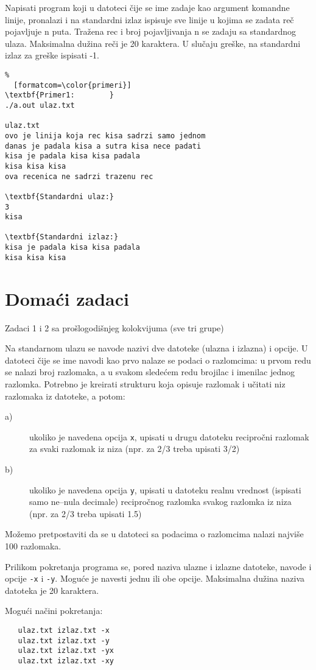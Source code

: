 \documentclass{article}
\begin{document}
\begin{z} 
Napisati program koji u datoteci čije se ime zadaje kao argument komandne linije, pronalazi i na standardni izlaz ispisuje sve linije u kojima se zadata reč pojavljuje n puta. Tražena rec i broj pojavljivanja n se zadaju sa standardnog ulaza. Maksimalna dužina reči je 20 karaktera. U slučaju greške, na standardni izlaz za greške ispisati -1.
\begin{Verbatim}%
  [formatcom=\color{primeri}]
\textbf{Primer1:        }
./a.out ulaz.txt

ulaz.txt
ovo je linija koja rec kisa sadrzi samo jednom
danas je padala kisa a sutra kisa nece padati
kisa je padala kisa kisa padala
kisa kisa kisa
ova recenica ne sadrzi trazenu rec

\textbf{Standardni ulaz:}
3
kisa

\textbf{Standardni izlaz:}
kisa je padala kisa kisa padala
kisa kisa kisa

\end{Verbatim}  
\end{z}

\newpage

\section{Domaći zadaci}

\begin{z}
Zadaci 1 i 2 sa prošlogodišnjeg kolokvijuma (sve tri grupe)
\end{z}

\begin{z}
Na standarnom ulazu se navode nazivi dve datoteke (ulazna i izlazna) i opcije. 
U datoteci \v cije se ime navodi kao prvo nalaze se podaci o razlomcima: 
   u prvom redu se nalazi broj razlomaka, a u svakom slede\' cem redu brojilac i imenilac jednog razlomka. 
   Potrebno je kreirati strukturu koja opisuje razlomak i u\v citati niz razlomaka
   iz datoteke, a potom:
   \begin{description}
      \item[a)] ukoliko je navedena opcija {\tt x}, upisati u drugu datoteku  
         recipro\v cni razlomak za svaki razlomak iz niza (npr. za 2/3 treba upisati 3/2)
      \item[b)] ukoliko je navedena opcija {\tt y}, upisati u datoteku 
         realnu vrednost (ispisati samo ne--nula decimale) recipro\v cnog razlomka svakog razlomka iz niza 
(npr. za 2/3 treba upisati 1.5)  
   \end{description}
   Mo\v zemo pretpostaviti da se u datoteci sa podacima o razlomcima nalazi najvi\v se 100 razlomaka.

  Prilikom pokretanja programa se, pored naziva ulazne i izlazne
  datoteke, navode i opcije {\tt -x} i {\tt -y}. Mogu\'ce je navesti jednu ili
  obe opcije. Maksimalna du\v zina naziva datoteka je 20 karaktera.
  
  Mogu\' ci na\v cini pokretanja:
  \begin{Verbatim}
   ulaz.txt izlaz.txt -x
   ulaz.txt izlaz.txt -y
   ulaz.txt izlaz.txt -yx
   ulaz.txt izlaz.txt -xy
  \end{Verbatim}
\end{z}
\end{document}
